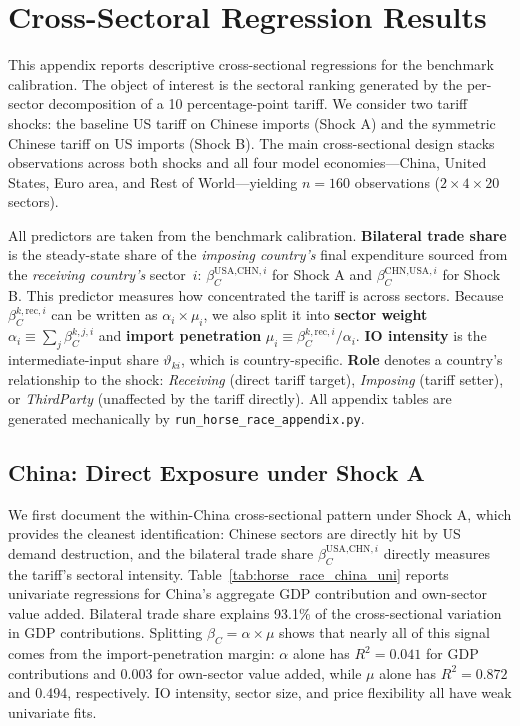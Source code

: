\section{Cross-Sectoral Regression Results}\label{sec:horse_race}



This appendix reports descriptive cross-sectional regressions for the benchmark calibration. The object of interest is the sectoral ranking generated by the per-sector decomposition of a 10 percentage-point tariff. We consider two tariff shocks: the baseline US tariff on Chinese imports (Shock A) and the symmetric Chinese tariff on US imports (Shock B). The main cross-sectional design stacks observations across both shocks and all four model economies---China, United States, Euro area, and Rest of World---yielding $n = 160$ observations ($2 \times 4 \times 20$ sectors).

All predictors are taken from the benchmark calibration. \textbf{Bilateral trade share} is the steady-state share of the \emph{imposing country's} final expenditure sourced from the \emph{receiving country's} sector~$i$: $\beta_C^{\text{USA,CHN},i}$ for Shock A and $\beta_C^{\text{CHN,USA},i}$ for Shock B. This predictor measures how concentrated the tariff is across sectors. Because $\beta_C^{k,\mathrm{rec},i}$ can be written as $\alpha_i \times \mu_i$, we also split it into \textbf{sector weight} $\alpha_i \equiv \sum_j \beta_C^{k,j,i}$ and \textbf{import penetration} $\mu_i \equiv \beta_C^{k,\mathrm{rec},i}/\alpha_i$. \textbf{IO intensity} is the intermediate-input share $\vartheta_{ki}$, which is country-specific. \textbf{Role} denotes a country's relationship to the shock: \emph{Receiving} (direct tariff target), \emph{Imposing} (tariff setter), or \emph{ThirdParty} (unaffected by the tariff directly). All appendix tables are generated mechanically by \texttt{run\_horse\_race\_appendix.py}.

\subsection{China: Direct Exposure under Shock A}

We first document the within-China cross-sectional pattern under Shock A, which provides the cleanest identification: Chinese sectors are directly hit by US demand destruction, and the bilateral trade share $\beta_C^{\text{USA,CHN},i}$ directly measures the tariff's sectoral intensity. Table~\ref{tab:horse_race_china_uni} reports univariate regressions for China's aggregate GDP contribution and own-sector value added. Bilateral trade share explains 93.1\% of the cross-sectional variation in GDP contributions. Splitting $\beta_C = \alpha \times \mu$ shows that nearly all of this signal comes from the import-penetration margin: $\alpha$ alone has $R^2 = 0.041$ for GDP contributions and $0.003$ for own-sector value added, while $\mu$ alone has $R^2 = 0.872$ and $0.494$, respectively. IO intensity, sector size, and price flexibility all have weak univariate fits.

